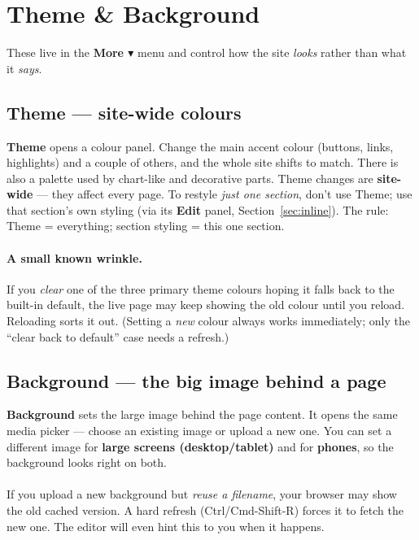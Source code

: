 \documentclass[11pt]{article}
\begin{document}
\section{Theme \& Background}

These live in the \textbf{More $\blacktriangledown$} menu and control how the site \emph{looks} rather
than what it \emph{says}.

\subsection{Theme --- site-wide colours}

\textbf{Theme} opens a colour panel. Change the main accent colour (buttons, links,
highlights) and a couple of others, and the whole site shifts to match. There is also
a palette used by chart-like and decorative parts. Theme changes are
\textbf{site-wide} --- they affect every page. To restyle \emph{just one section},
don't use Theme; use that section's own styling (via its \textbf{Edit} panel,
Section~\ref{sec:inline}). The rule: Theme = everything; section styling = this one
section.

\paragraph{A small known wrinkle.} If you \emph{clear} one of the three primary theme
colours hoping it falls back to the built-in default, the live page may keep showing
the old colour until you reload. Reloading sorts it out. (Setting a \emph{new} colour
always works immediately; only the ``clear back to default'' case needs a refresh.)

\subsection{Background --- the big image behind a page}

\textbf{Background} sets the large image behind the page content. It opens the same
media picker --- choose an existing image or upload a new one. You can set a different
image for \textbf{large screens (desktop/tablet)} and for \textbf{phones}, so the
background looks right on both.

\paragraph{} If you upload a new background but \emph{reuse a filename}, your browser
may show the old cached version. A hard refresh (Ctrl/Cmd-Shift-R) forces it to fetch
the new one. The editor will even hint this to you when it happens.
\end{document}
